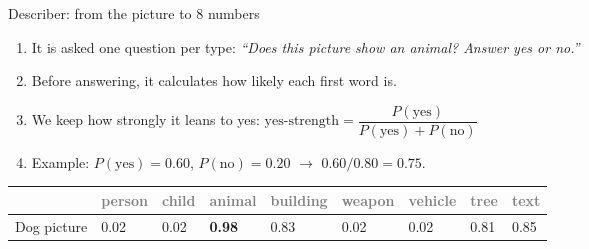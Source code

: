 \documentclass[aspectratio=169,11pt]{beamer}
\newcommand{\h}[1]{\textcolor{grey}{#1}}
\newcommand{\remark}[1]{\par\vspace{0.35cm}{\small\textcolor{grey}{#1}}}
\begin{document}
\begin{frame}{Describer: from the picture to 8 numbers}
\begin{enumerate}\setlength\itemsep{5pt}
  \item It is asked one question per type: \emph{``Does this picture show an animal? Answer yes or no.''}
  \item Before answering, it calculates how likely each first word is.
  \item We keep how strongly it leans to yes:\quad
        $\text{yes-strength} = \dfrac{P(\text{yes})}{P(\text{yes}) + P(\text{no})}$
  \item Example: $P(\text{yes}) = 0.60$, $P(\text{no}) = 0.20$ $\to$ $0.60 / 0.80 = \mathbf{0.75}$.
\end{enumerate}
\vspace{0.3cm}
\small
\begin{tabular}{@{}l *{8}{C{1.2cm}}@{}}
\toprule
 & \h{person} & \h{child} & \h{animal} & \h{building} & \h{weapon} & \h{vehicle} & \h{tree} & \h{text}\\
\midrule
Dog picture & 0.02 & 0.02 & \textbf{0.98} & 0.83 & 0.02 & 0.02 & 0.81 & 0.85\\
\bottomrule
\end{tabular}
\remark{Right about the animal, but it also says yes to building and tree, which are not there. That is why no agent decides alone.}
\end{frame}
\end{document}
